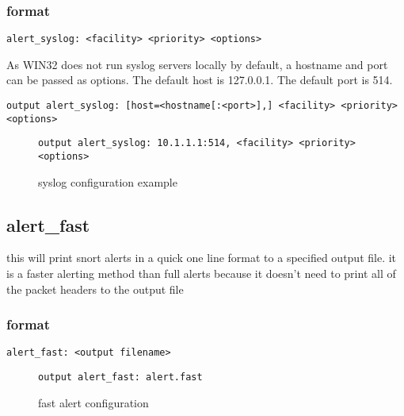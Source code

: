 \documentclass[english]{report}
\newenvironment{note}{
    \vspace{10pt}{\textsf{
        {\Huge{$\triangle$\hspace{-12.5pt}{\Large{$^!$}}}}\hspace{5pt}
        {\Large{NOTE}}
    }
    }

    \begin{center}
    \par\vspace{-10pt}
    \begin{lrbox}{\savepar}
    \begin{minipage}[r]{6.2in}
}
{
    \end{minipage}
    \end{lrbox}
    \fbox{
        \usebox{
            \savepar
        }
    }
    \par\vskip10pt
    \end{center}
}
\begin{document}
\subsubsection{format}

\begin{verbatim}
alert_syslog: <facility> <priority> <options>
\end{verbatim}


\begin{note}
As WIN32 does not run syslog servers locally by default, a hostname and port
can be passed as options.  The default host is 127.0.0.1.  The default port is
514.
\end{note}

\begin{verbatim}
output alert_syslog: [host=<hostname[:<port>],] <facility> <priority> <options>
\end{verbatim}

\begin{figure}[!hbpt]
\begin{verbatim}
output alert_syslog: 10.1.1.1:514, <facility> <priority> <options>
\end{verbatim}

\caption{syslog configuration example\label{syslog example}}
\end{figure}

\subsection{alert\_fast}

this will print snort alerts in a quick one line format to a specified
output file. it is a faster alerting method than full alerts because
it doesn't need to print all of the packet headers to the output file


\subsubsection{format}

\begin{verbatim}
alert_fast: <output filename>
\end{verbatim}
%
\begin{figure}[!hbpt]
\begin{verbatim}
output alert_fast: alert.fast
\end{verbatim}

\caption{\label{fast alert configuration}fast alert configuration}
\end{figure}
\end{document}
